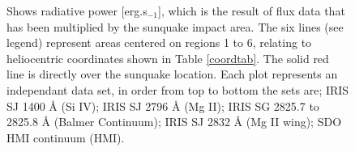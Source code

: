 \begin{figure}[H]
\begin{center}
  \end{center}                                                                                                                                                                                                                                                                                                                                                                                                                                                                                                                                                                                                                                                                                                                                                                                                                                                                                                                                                                                                                                                                                                                                                                                                                                                                                                                                                                                                                                                                                                                                                                                                                                                                                                                                                                                                                                                                                                                                                                                                                                                                                                                                                                                                                                                                                                                                                                                                                                                                                  
  \caption{Shows radiative power [erg.s$_{-1}$], which is the result of flux data that has been multiplied by the sunquake impact area. The six lines (see legend) represent areas centered on regions 1 to 6, relating to heliocentric coordinates shown in Table \ref{coordtab}. The solid red line is directly over the sunquake location. Each plot represents an independant data set, in order from top to bottom the sets are; IRIS SJ 1400 Å (Si IV); IRIS SJ 2796 Å (Mg II); IRIS SG  2825.7 to 2825.8 Å (Balmer Continuum); IRIS SJ 2832 Å (Mg II wing); SDO HMI continuum (HMI).}\label{powerladder}
\end{figure}

